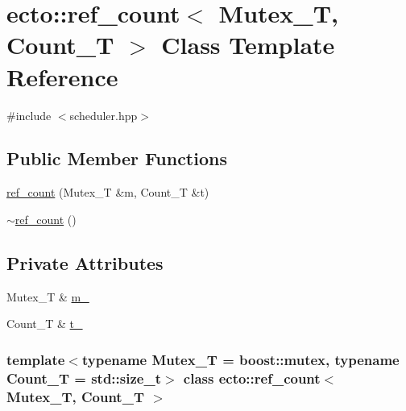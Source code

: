 \hypertarget{classecto_1_1ref__count}{\section{ecto\-:\-:ref\-\_\-count$<$ \-Mutex\-\_\-\-T, \-Count\-\_\-\-T $>$ \-Class \-Template \-Reference}
\label{classecto_1_1ref__count}
}


{\ttfamily \#include $<$scheduler.\-hpp$>$}

\subsection*{\-Public \-Member \-Functions}
\begin{DoxyCompactItemize}
\item 
\hyperlink{classecto_1_1ref__count_a39fc7e105b142b7444a90dc6a3796828}{ref\-\_\-count} (\-Mutex\-\_\-\-T \&m, \-Count\-\_\-\-T \&t)
\item 
\hyperlink{classecto_1_1ref__count_a22b67e2d381344ff4c9b4c453bb47e23}{$\sim$ref\-\_\-count} ()
\end{DoxyCompactItemize}
\subsection*{\-Private \-Attributes}
\begin{DoxyCompactItemize}
\item 
\-Mutex\-\_\-\-T \& \hyperlink{classecto_1_1ref__count_a766db0f4309f593f6c3086a1ebead3a5}{m\-\_\-}
\item 
\-Count\-\_\-\-T \& \hyperlink{classecto_1_1ref__count_a689842816509f8f13710aee79b8c9898}{t\-\_\-}
\end{DoxyCompactItemize}
\subsubsection*{template$<$typename Mutex\-\_\-\-T = boost\-::mutex, typename Count\-\_\-\-T = std\-::size\-\_\-t$>$ class ecto\-::ref\-\_\-count$<$ Mutex\-\_\-\-T, Count\-\_\-\-T $>$}




